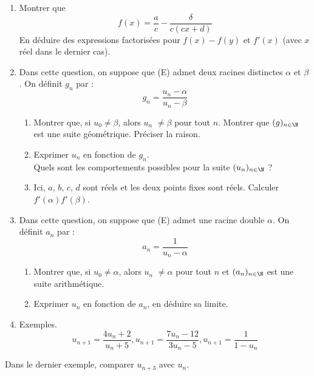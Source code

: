 \begin{enumerate}
\item Montrer que 
\begin{displaymath}
 f(x)=\frac{a}{c}-\frac{\delta}{c(cx+d)}
\end{displaymath}
En déduire des expressions factorisées pour $f(x)-f(y)$ et $f'(x)$ (avec $x$ réel dans le dernier cas).

\item  Dans cette question, on suppose que (E) admet deux racines distinctes $\alpha $ et $\beta $. On définit $g_n$ par :
\begin{displaymath}
 g_n = \frac{u_{n}-\alpha }{u_{n}-\beta}
\end{displaymath}

\begin{enumerate}
 \item Montrer que, si $u_{0}\neq \beta $, alors $u_{n}$ $\neq \beta $ pour tout $n$. Montrer que $(g)_{n\in \N}$ est une suite g{\'e}om{\'e}trique. Préciser la raison.
 \item Exprimer $u_n$ en fonction de $g_n$.\\ Quels sont les comportements possibles pour la suite $(u_n)_{n\in \N}$ ?
 \item Ici, $a$, $b$, $c$, $d$ sont réels et les deux points fixes sont réels. Calculer $f'(\alpha)f'(\beta)$.
\end{enumerate}
\item  Dans cette question, on suppose que (E) admet une racine double $\alpha $. On définit $a_n$ par :
\begin{displaymath}
 a_n = \frac{1}{u_n-\alpha}
\end{displaymath}
\begin{enumerate}
 \item Montrer que, si $u_{0}\neq \alpha $, alors $u_{n}$ $\neq \alpha $ pour tout $n$ et $(a_n)_{n\in \N}$ est une suite arithm{\'e}tique.
 \item Exprimer $u_n$ en fonction de $a_n$, en déduire sa limite.
\end{enumerate}
  \item  Exemples.
\[
u_{n+1}=\frac{4u_{n}+2}{u_{n}+5}, u_{n+1}=\frac{7u_{n}-12}{3u_{n}-5}, u_{n+1}=\frac{1}{1-u_{n}}
\]
\end{enumerate}
Dans le dernier exemple, comparer $u_{n+3}$ avec $u_n$.